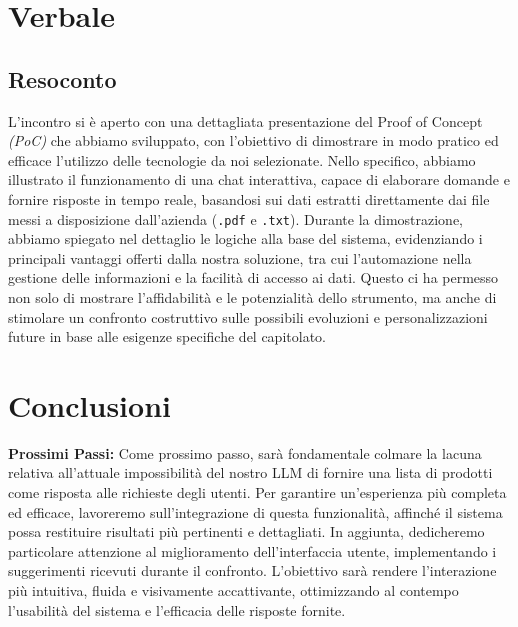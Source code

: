 \documentclass{article}
\begin{document}
\section{Verbale}
    \subsection{Resoconto}
    L'incontro si è aperto con una dettagliata presentazione del Proof of Concept \textit{(PoC)} che abbiamo sviluppato, con l'obiettivo di dimostrare in modo pratico ed efficace l'utilizzo delle tecnologie da noi selezionate. Nello specifico, abbiamo illustrato il funzionamento di una chat interattiva, capace di elaborare domande e fornire risposte in tempo reale, basandosi sui dati estratti direttamente dai file messi a disposizione dall'azienda (\texttt{.pdf} e \texttt{.txt}).
    Durante la dimostrazione, abbiamo spiegato nel dettaglio le logiche alla base del sistema, evidenziando i principali vantaggi offerti dalla nostra soluzione, tra cui l'automazione nella gestione delle informazioni e la facilità di accesso ai dati. Questo ci ha permesso non solo di mostrare l'affidabilità e le potenzialità dello strumento, ma anche di stimolare un confronto costruttivo sulle possibili evoluzioni e personalizzazioni future in base alle esigenze specifiche del capitolato.


    \section{Conclusioni}  %
    \textbf{Prossimi Passi:} 
    Come prossimo passo, sarà fondamentale colmare la lacuna relativa all'attuale impossibilità del nostro LLM di fornire una lista di prodotti come risposta alle richieste degli utenti. Per garantire un'esperienza più completa ed efficace, lavoreremo sull'integrazione di questa funzionalità, affinché il sistema possa restituire risultati più pertinenti e dettagliati.
    In aggiunta, dedicheremo particolare attenzione al miglioramento dell'interfaccia utente, implementando i suggerimenti ricevuti durante il confronto. L'obiettivo sarà rendere l'interazione più intuitiva, fluida e visivamente accattivante, ottimizzando al contempo l'usabilità del sistema e l'efficacia delle risposte fornite.
\end{document}

